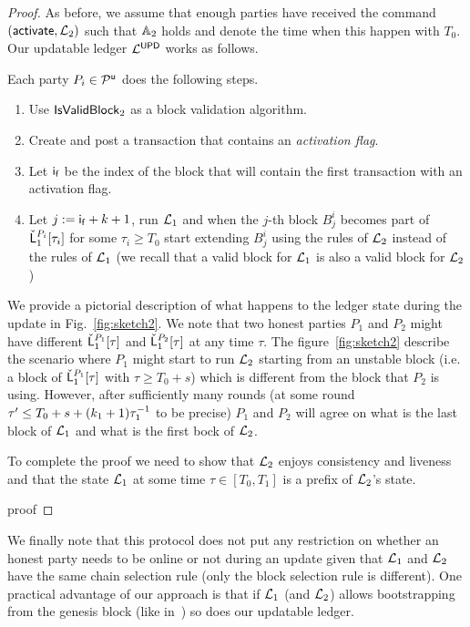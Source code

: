 \begin{proof}
As before, we assume that enough parties have received the command $(\mathsf{activate}, \mathcal{L}_2)$ such that
$\mathbb{A}_2$ holds and denote the time when this happen with $T_0$.
Our updatable ledger $\mathcal{L}^\mathsf{UPD}$ works as follows.

Each party $P_i\in\mathcal{P}^\mathsf{u}$ does the following steps.
\begin{enumerate}
	\item Use $\mathsf{IsValidBlock}_2$ as a block validation algorithm.
	\item Create and post a transaction that contains an \emph{activation flag}. 
	\item Let $\mathsf{i_f}$ be the index of the block that will contain the first transaction with an activation flag.
	\item Let $j:=\mathsf{i_f}+k+1$, run $\mathcal{L}_1$ and when the $j$-th block $B^i_j$ becomes part of $\check {\mathsf{L}}_1^{P_i}[\tau_i]$ for some $\tau_i \geq T_0$ start extending $B^i_{j}$ using the rules of $\mathcal{L}_2$ instead of the rules of $\mathcal{L}_1$ (we recall that a valid block for $\mathcal{L}_1$ is also a valid block for $\mathcal{L}_2$)
\end{enumerate}


We provide a pictorial description of what happens to the ledger state during the update in Fig.~\ref{fig:sketch2}.
We note that two honest parties $P_1$ and $P_2$ might have different $\check {\mathsf{L}}_1^{P_1}[\tau]$ and  $\check {\mathsf{L}}_1^{P_2}[\tau]$ at any time $\tau$. The figure~\ref{fig:sketch2}
describe the scenario where $P_1$ might start to run $\mathcal{L}_2$ starting from an 
unstable block (i.e. a block of  $\check {\mathsf{L}}_1^{P_1}[\tau]$ with $\tau\geq
T_0+s$) which is different from the block that $P_2$ is using. However, after sufficiently many
 rounds (at some round  $\tau'\leq T_0+s+(k_1+1)\tau_1^{-1}$ to be precise) $P_1$ and $P_2$ will agree on what is the last block of $\mathcal{L}_1$ and what is the first bock of $\mathcal{L}_2$.

 

To complete the proof we need to show that $\mathcal{L}_2$ enjoys consistency and liveness
and that the state $\mathcal{L}_1$ at some time $\tau\in [T_0,T_1]$ is a prefix of $\mathcal{L}_2$'s state. 


{proof}

\end{proof}



We finally note that this protocol does not put any restriction on whether an honest party needs to be online or not during an update given that $\mathcal{L}_1$ and $\mathcal{L}_2$ have the same chain selection rule (only the block selection rule is different).
One practical advantage of our approach is that if $\mathcal{L}_1$ (and $\mathcal{L}_2$) allows bootstrapping from the genesis block (like in~\cite{CCS:BGKRZ18}) so does our updatable ledger.





